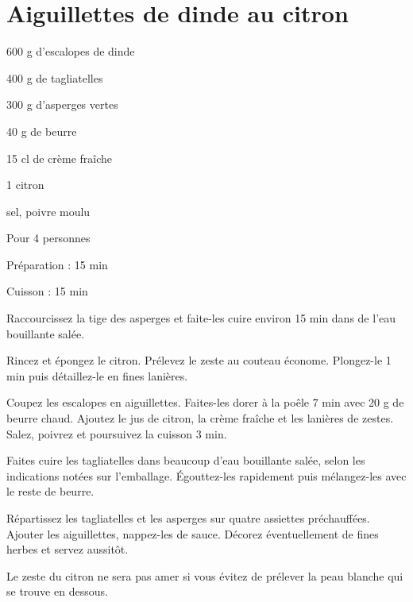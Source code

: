 \section[\normalsize{Aiguillettes de dinde au citron}]{Aiguillettes de dinde au citron}

\begin{ingredients}
\item 600 g d’escalopes de dinde 
\item 400 g de tagliatelles
\item 300 g d’asperges vertes 
\item 40 g de beurre
\item 15 cl de cr\`eme fra\^iche
\item 1 citron
\item sel, poivre moulu
\end{ingredients}
\begin{infos}
\item Pour 4 personnes
\item Préparation : 15 min
\item Cuisson : 15 min
\end{infos}
\begin{etapes}
\item Raccourcissez la tige des asperges et faite-les cuire environ 15 min dans de l’eau bouillante sal\'ee.
\item Rincez et \'epongez le citron. Pr\'elevez le zeste au couteau \'econome. Plongez-le 1 min puis d\'etaillez-le en fines lani\`eres.
\item Coupez les escalopes en aiguillettes. Faites-les dorer \`a la poêle 7 min avec 20 g de beurre chaud. Ajoutez le jus de citron, la cr\`eme fra\^iche et les lani\`eres de zestes. Salez, poivrez et poursuivez la cuisson 3 min.
\item Faites cuire les tagliatelles dans beaucoup d’eau bouillante sal\'ee, selon les indications not\'ees sur l’emballage. Égouttez-les rapidement puis m\'elangez-les avec le reste de beurre.
\item R\'epartissez les tagliatelles et les asperges sur quatre assiettes pr\'echauff\'ees. Ajouter les aiguillettes, nappez-les de sauce. D\'ecorez \'eventuellement de fines herbes et servez aussitôt.
\end{etapes}
\begin{conseils}
Le zeste du citron ne sera pas amer si vous \'evitez de pr\'elever la peau blanche qui se trouve en dessous.
\end{conseils}
